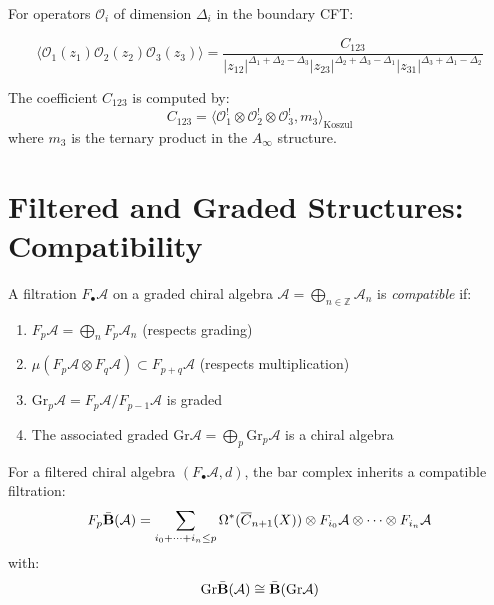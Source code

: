 \begin{example}
For operators $\mathcal{O}_i$ of dimension $\Delta_i$ in the boundary CFT:

$$\langle \mathcal{O}_1(z_1) \mathcal{O}_2(z_2) \mathcal{O}_3(z_3) \rangle = \frac{C_{123}}{|z_{12}|^{\Delta_1+\Delta_2-\Delta_3}|z_{23}|^{\Delta_2+\Delta_3-\Delta_1}|z_{31}|^{\Delta_3+\Delta_1-\Delta_2}}$$

The coefficient $C_{123}$ is computed by:
$$C_{123} = \langle \mathcal{O}_1^! \otimes \mathcal{O}_2^! \otimes \mathcal{O}_3^!, m_3 \rangle_{\text{Koszul}}$$
where $m_3$ is the ternary product in the $A_\infty$ structure.
\end{example}

\section{Filtered and Graded Structures: Compatibility}

\begin{definition}
A filtration $F_\bullet\mathcal{A}$ on a graded chiral algebra $\mathcal{A} = \bigoplus_{n \in \mathbb{Z}} \mathcal{A}_n$ is \emph{compatible} if:
\begin{enumerate}
\item $F_p\mathcal{A} = \bigoplus_{n} F_p\mathcal{A}_n$ (respects grading)
\item $\mu(F_p\mathcal{A} \otimes F_q\mathcal{A}) \subset F_{p+q}\mathcal{A}$ (respects multiplication)
\item $\text{Gr}_p\mathcal{A} = F_p\mathcal{A}/F_{p-1}\mathcal{A}$ is graded
\item The associated graded $\text{Gr}\mathcal{A} = \bigoplus_p \text{Gr}_p\mathcal{A}$ is a chiral algebra
\end{enumerate}
\end{definition}

\begin{theorem}
For a filtered chiral algebra $(F_\bullet\mathcal{A}, d)$, the bar complex inherits a compatible filtration:
$$F_p\bar{\mathbf{B}}(\mathcal{A}) = \sum_{i_0 + \cdots + i_n \leq p} \Omega^*(\overline{C}_{n+1}(X)) \otimes F_{i_0}\mathcal{A} \otimes \cdots \otimes F_{i_n}\mathcal{A}$$
with:
$$\text{Gr}\bar{\mathbf{B}}(\mathcal{A}) \cong \bar{\mathbf{B}}(\text{Gr}\mathcal{A})$$
\end{theorem}

